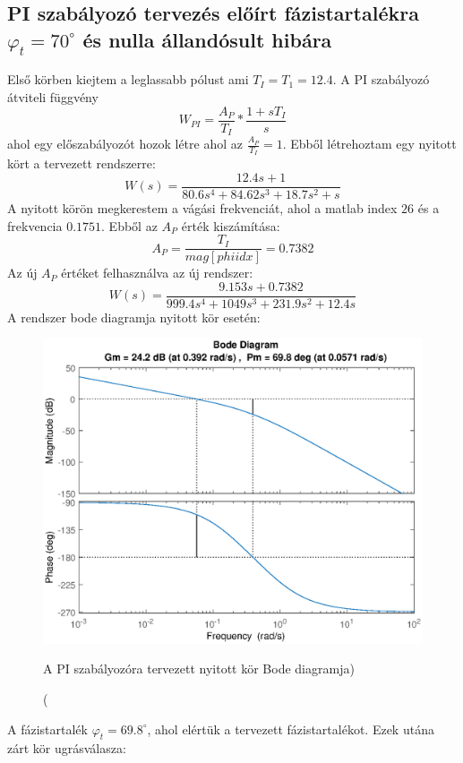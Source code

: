 \documentclass[12pt]{article}
\begin{document}
\subsection{PI szabályozó tervezés előírt fázistartalékra $\varphi_t=70^\circ$ és nulla állandósult hibára}
Első körben kiejtem a leglassabb pólust ami $T_I=T_1=12.4$. A PI szabályozó átviteli függvény \[W_{PI}=\frac{A_P}{T_I}*\frac{1+sT_I}{s}\]  ahol egy előszabályozót hozok létre ahol az  $\frac{A_P}{T_I}=1$. Ebből létrehoztam egy nyitott kört a tervezett rendszerre:
\[W(s)=\frac{12.4s+1}{80.6 s^4+84.62s^3+18.7s^2+s}\]
A nyitott körön megkerestem a vágási frekvenciát, ahol a matlab index $26$ és a frekvencia  $0.1751$. Ebből az $A_P$ érték kiszámítása:
\[A_P=\frac{T_I}{mag[phiidx]}=0.7382\]
Az új $A_P$ értéket felhasználva az új rendszer:
\[W(s)=\frac{9.153s +0.7382}{999.4 s^4+1049s^3+231.9s^2+12.4s}\]
A rendszer bode diagramja nyitott kör esetén:
\begin{figure}[H]
\centering
\includegraphics[scale=.70]{WOPI}
\caption(A PI szabályozóra tervezett nyitott kör Bode diagramja)
\end{figure}
A fázistartalék $\varphi_t=69.8^\circ$, ahol elértük a tervezett fázistartalékot.
Ezek utána zárt kör ugrásválasza:
\end{document}
